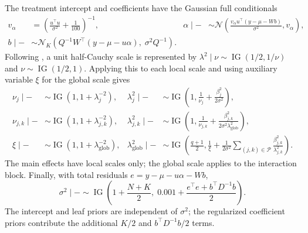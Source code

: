 \documentclass[12pt]{article}
\begin{document}
The treatment intercept and coefficients have the Gaussian full conditionals
\begin{align}
 v_\alpha&=\left(\frac{u^\top u}{\sigma^2}+\frac{1}{100}\right)^{-1},
 &\alpha\mid -&\sim\mathcal N\left(
 \frac{v_\alpha u^\top(y-\mu-Wb)}{\sigma^2},v_\alpha\right),
 \label{eq:fc_alpha}\\
 b\mid -&\sim\mathcal N_K\left(
 Q^{-1}W^\top(y-\mu-u\alpha),\;\sigma^2Q^{-1}\right).
 \label{eq:fc_beta}
\end{align}
Following \citet{makalic2015simple}, a unit half-Cauchy scale is represented
by $\lambda^2\mid\nu\sim\operatorname{IG}(1/2,1/\nu)$ and
$\nu\sim\operatorname{IG}(1/2,1)$. Applying this to each local scale and
using auxiliary variable $\xi$ for the global scale gives
\begin{align}
 \nu_j\mid -&\sim\operatorname{IG}(1,1+\lambda_j^{-2}),
 &\lambda_j^2\mid -&\sim\operatorname{IG}\left(
 1,\frac{1}{\nu_j}+\frac{\beta_j^2}{2\sigma^2}\right),
 \label{eq:fc_lambda_main}\\
 \nu_{j,k}\mid -&\sim\operatorname{IG}(1,1+\lambda_{j,k}^{-2}),
 &\lambda_{j,k}^2\mid -&\sim\operatorname{IG}\left(
 1,\frac{1}{\nu_{j,k}}+
 \frac{\beta_{j,k}^2}{2\sigma^2\lambda_{\mathrm{glob}}^2}\right),
 \label{eq:fc_lambda_int}\\
 \xi\mid -&\sim\operatorname{IG}(1,1+\lambda_{\mathrm{glob}}^{-2}),
 &\lambda_{\mathrm{glob}}^2\mid -&\sim\operatorname{IG}\left(
 \frac{q+1}{2},\frac{1}{\xi}+\frac{1}{2\sigma^2}
 \sum_{(j,k)\in\mathcal P}\frac{\beta_{j,k}^2}{\lambda_{j,k}^2}\right).
 \label{eq:fc_global}
\end{align}
The main effects have local scales only; the global scale applies to the
interaction block. Finally, with total residuals $e=y-\mu-u\alpha-Wb$,
\begin{equation}
 \sigma^2\mid -\sim\operatorname{IG}\left(
 1+\frac{N+K}{2},\;0.001+\frac{e^\top e+b^\top D^{-1}b}{2}\right).
 \label{eq:fc_sigma}
\end{equation}
The intercept and leaf priors are independent of $\sigma^2$; the
regularized coefficient priors contribute the additional $K/2$ and
$b^\top D^{-1}b/2$ terms.
\end{document}
